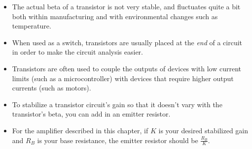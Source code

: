 \begin{itemize}
\item The actual beta of a transistor is not very stable, and fluctuates quite a bit both within manufacturing and with environmental changes such as temperature.
\item When used as a switch, transistors are usually placed at the \emph{end} of a circuit in order to make the circuit analysis easier.
\item Transistors are often used to couple the outputs of devices with low current limits (such as a microcontroller) with devices that require higher output currents (such as motors).
\item To stabilize a transistor circuit's gain so that it doesn't vary with the transistor's beta, you can add in an emitter resistor.
\item For the amplifier described in this chapter, if $K$ is your desired stabilized gain and $R_B$ is your base resistance, the emitter resistor should be $\frac{R_B}{K}$.
\end{itemize}

\applysection


